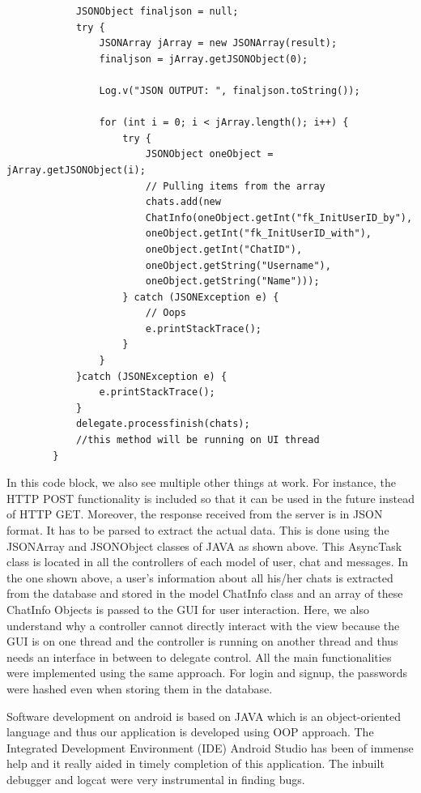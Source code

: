 \documentclass{article}
\begin{document}
\begin{lstlisting}
            JSONObject finaljson = null;
            try {
                JSONArray jArray = new JSONArray(result);
                finaljson = jArray.getJSONObject(0);

                Log.v("JSON OUTPUT: ", finaljson.toString());

                for (int i = 0; i < jArray.length(); i++) {
                    try {
                        JSONObject oneObject = jArray.getJSONObject(i);
                        // Pulling items from the array
                        chats.add(new 									
                        ChatInfo(oneObject.getInt("fk_InitUserID_by"), 				
                        oneObject.getInt("fk_InitUserID_with"), 					
                        oneObject.getInt("ChatID"), 							
                        oneObject.getString("Username"), 						
                        oneObject.getString("Name")));
                    } catch (JSONException e) {
                        // Oops
                        e.printStackTrace();
                    }
                }
            }catch (JSONException e) {
                e.printStackTrace();
            }
            delegate.processfinish(chats);
            //this method will be running on UI thread
        }
\end{lstlisting}

In this code block, we also see multiple other things at work. For instance, the HTTP POST functionality is included so that it can be used in the future instead of HTTP GET. Moreover, the response received from the server is in JSON format. It has to be parsed to extract the actual data. This is done using the JSONArray and JSONObject classes of JAVA as shown above.
This AsyncTask class is located in all the controllers of each model of user, chat and messages. In the one shown above, a user’s information about all his/her chats is extracted from the database and stored in the model ChatInfo class and an array of these ChatInfo Objects is passed to the GUI for user interaction.
Here, we also understand why a controller cannot directly interact with the view because the GUI is on one thread and the controller is running on another thread and thus needs an interface in between to delegate control. All the main functionalities were implemented using the same approach. For login and signup, the passwords were hashed even when storing them in the database. \par
Software development on android is based on JAVA which is an object-oriented language and thus our application is developed using OOP approach.
The Integrated Development Environment (IDE) Android Studio has been of immense help and it really aided in timely completion of this application. The inbuilt debugger and logcat were very instrumental in finding bugs.
\end{document}
